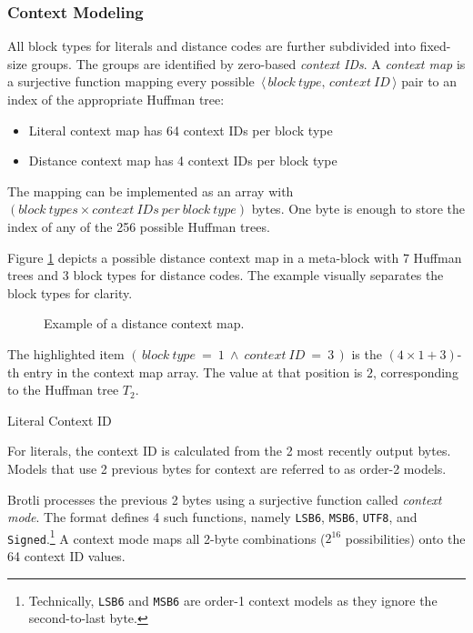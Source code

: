 \documentclass[english,master,dept460,male,cpp,cpdeclaration]{diploma}
\makeatletter
\renewcommand\paragraph
	{\@startsection{paragraph}{4}{\z@}
	{-3.25ex plus 1ex minus .2ex}
	{1.5ex plus .2ex}
	{\normalfont\normalsize\bfseries}}
\newcommand{\subfoursection}[1]{\paragraph{#1}}
\newcommand{\nosep}{\itemsep0em}
\newcommand{\pair}[2]{$\,\langle\,#1,\,#2\,\rangle$}
\newcommand{\texfigure}[1]{
}
\makeatother
\begin{document}
		\subsubsection{Context Modeling}
		
		All block types for literals and distance codes are further subdivided into fixed-size groups. The groups are identified by zero-based \emph{context IDs}. A \emph{context map} is a surjective function mapping every possible \pair{block\ type}{context\ ID} pair to an index of the appropriate Huffman tree:
		
		\begin{itemize} \nosep
			\item Literal context map has 64 context IDs per block type
			\item Distance context map has 4 context IDs per block type
		\end{itemize}
		
		\noindent
		The mapping can be implemented as an array with $(block\ types \times context\ IDs\ per\ block\ type)$ bytes. One byte is enough to store the index of any of the 256 possible Huffman trees.
		
		Figure \ref{fig:distance-context-map-example} depicts a possible distance context map in a meta-block with 7 Huffman trees and 3 block types for distance codes. The example visually separates the block types for clarity.
		
		\begin{figure}[H]
			\centering
			\smallskip
			\texfigure{distance-context-map-example}
			\caption{Example of a distance context map.}
			\label{fig:distance-context-map-example}
		\end{figure}
		
		\noindent
		The highlighted item $(\,block\ type\ =\ 1\ \wedge\ context\ ID\ =\ 3\,)$ is the $(4 \times 1 + 3)$-th entry in the context map array. The value at that position is $2$, corresponding to the Huffman tree $T_2$.
		
			\subfoursection{Literal Context ID}
			
			For literals, the context ID is calculated from the 2 most recently output bytes. Models that use 2 previous bytes for context are referred to as order-2 models\cite{FiniteContextModelling}.
			
			Brotli processes the previous 2 bytes using a surjective function called \emph{context mode}. The format defines 4 such functions, namely \verb|LSB6|, \verb|MSB6|, \verb|UTF8|, and \verb|Signed|.\footnote{Technically, \texttt{LSB6} and \texttt{MSB6} are order-1 context models as they ignore the second-to-last byte.} A context mode maps all 2-byte combinations ($2^{16}$ possibilities) onto the 64 context ID values.
			
\end{document}
